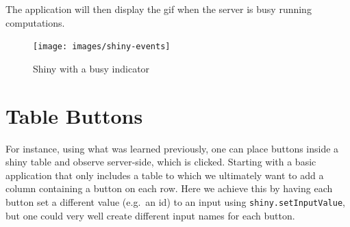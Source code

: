 \documentclass[10pt,]{krantz}
\makeatletter
\newenvironment{Shaded}{\begin{snugshade}}{\end{snugshade}}
\newcommand{\ControlFlowTok}[1]{\textcolor[rgb]{0.27,0.27,0.27}{\textbf{#1}}}
\newcommand{\DataTypeTok}[1]{\textcolor[rgb]{0.27,0.27,0.27}{#1}}
\newcommand{\KeywordTok}[1]{\textcolor[rgb]{0.27,0.27,0.27}{\textbf{#1}}}
\newcommand{\NormalTok}[1]{#1}
\newcommand{\OperatorTok}[1]{\textcolor[rgb]{0.43,0.43,0.43}{\textbf{#1}}}
\newcommand{\OtherTok}[1]{\textcolor[rgb]{0.37,0.37,0.37}{#1}}
\newcommand{\StringTok}[1]{\textcolor[rgb]{0.5,0.5,0.5}{#1}}
\newenvironment{kframe}{%
\medskip{}
\setlength{\fboxsep}{.8em}
 \def\at@end@of@kframe{}%
 \ifinner\ifhmode%
  \def\at@end@of@kframe{\end{minipage}}%
  \begin{minipage}{\columnwidth}%
 \fi\fi%
 \def\FrameCommand##1{\hskip\@totalleftmargin \hskip-\fboxsep
 \colorbox{shadecolor}{##1}\hskip-\fboxsep
     \hskip-\linewidth \hskip-\@totalleftmargin \hskip\columnwidth}%
 \MakeFramed {\advance\hsize-\width
   \@totalleftmargin\z@ \linewidth\hsize
   \@setminipage}}%
 {\par\unskip\endMakeFramed%
 \at@end@of@kframe}
\renewenvironment{Shaded}{\begin{kframe}}{\end{kframe}}
\makeatother
\begin{document}
The application will then display the gif when the server is busy running computations.

\begin{figure}[H]

{\centering \texttt{[image: images/shiny-events]} 

}

\caption{Shiny with a busy indicator}\label{fig:shiny-events}
\end{figure}

\hypertarget{shiny-tips-table-btn}{%
\section{Table Buttons}\label{shiny-tips-table-btn}}

For instance, using what was learned previously, one can place buttons inside a shiny table and observe server-side, which is clicked. Starting with a basic application that only includes a table to which we ultimately want to add a column containing a button on each row. Here we achieve this by having each button set a different value (e.g.~an id) to an input using \texttt{shiny.setInputValue}, but one could very well create different input names for each button.

\begin{Shaded}
\end{Shaded}
\end{document}

